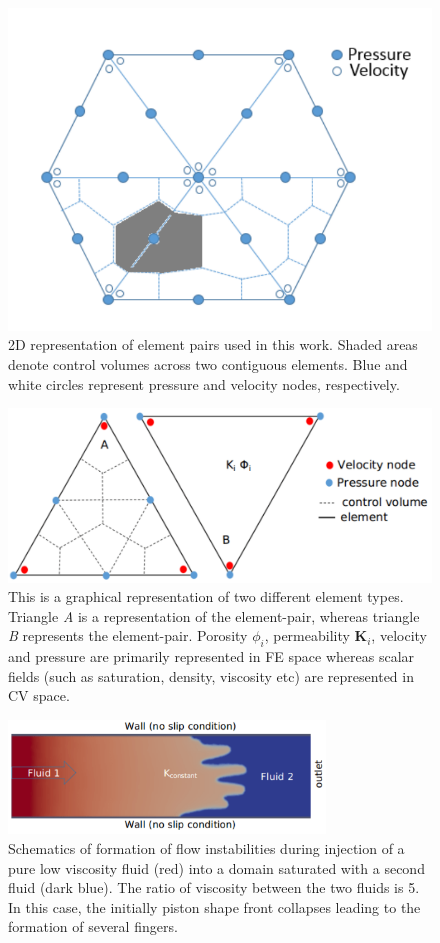 
\begin{figure}[h]
\centering
\vbox{\includegraphics[width=.5\textwidth]{./Pics/P1DGP2.pdf}}
\caption{2D representation of  element pairs used in this work. Shaded areas denote control volumes across two contiguous elements. Blue and white circles represent pressure and velocity nodes, respectively.} 
\label{fig:fem_cv}
\end{figure}

\clearpage

\begin{figure}[h]
\centering
\vbox{\includegraphics[width=.75\textwidth]{./Pics/element_n.pdf}}
\caption{This is a graphical representation of two different element types. Triangle {\it A} is a representation of the  element-pair, whereas triangle {\it B} represents the  element-pair. Porosity $\phi_{i}$, permeability {\bf K}$_{i}$, velocity and pressure are primarily represented in FE space whereas scalar fields (such as saturation, density, viscosity etc) are represented in CV space.}
\label{fig:fem_elem}
\end{figure}
\clearpage

\begin{figure}[h]
\centering
\vbox{\includegraphics[width=0.75\textwidth]{./Pics/phase_vol_frac_uni_perm_1.pdf}}
\caption{Schematics of formation of flow instabilities during injection of a pure low viscosity fluid (red) into a domain saturated with a second fluid (dark blue). The ratio of viscosity between the two fluids is 5. In this case, the initially piston shape front collapses leading to the formation of several fingers.}
\label{fig:simple_case}
\end{figure}
\clearpage


